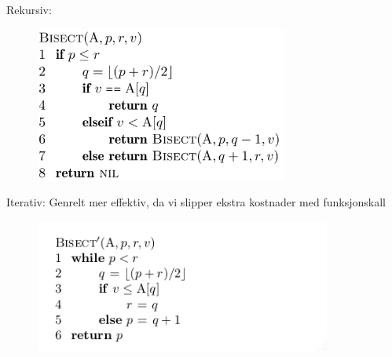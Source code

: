 \documentclass[12pt]{report}
\begin{document}
\vspace{\baselineskip}

\vspace{\baselineskip}
\begin{multicols}{2}
\textcolor[HTML]{353535}{Rekursiv: }\par




\begin{figure}[H]
	\begin{Center}
		\includegraphics[width=3.27in,height=2.01in]{./media/image40.png}
	\end{Center}
\end{figure}



\par

\textcolor[HTML]{353535}{Iterativ: Genrelt mer effektiv, da vi slipper ekstra kostnader med funksjonskall}\par




\begin{figure}[H]
	\begin{Center}
		\includegraphics[width=3.83in,height=1.73in]{./media/image41.png}
	\end{Center}
\end{figure}



\par


\vspace{\baselineskip}

\end{multicols}
\setlength{\parskip}{6.0pt}
\end{document}
